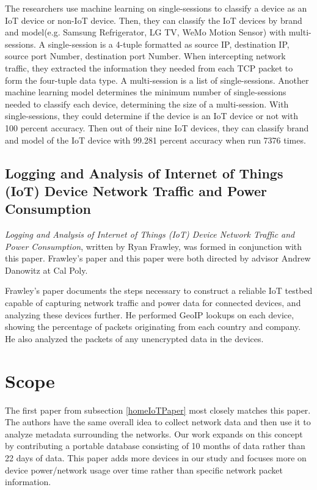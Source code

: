 The researchers use machine learning on single-sessions to classify a device as an IoT device or non-IoT device. Then, they can classify the IoT devices by brand and model(e.g. Samsung Refrigerator, LG TV, WeMo Motion Sensor) with multi-sessions. A single-session is a 4-tuple formatted as source IP, destination IP, source port Number, destination port Number. When intercepting network traffic, they extracted the information they needed from each TCP packet to form the four-tuple data type. A multi-session is a list of single-sessions. Another machine learning model determines the minimum number of single-sessions needed to classify each device, determining the size of a multi-session. With single-sessions, they could determine if the device is an IoT device or not with 100 percent accuracy. Then out of their nine IoT devices, they can classify brand and model of the IoT device with 99.281 percent accuracy when run 7376 times.

\subsection{Logging and Analysis of Internet of Things (IoT) Device Network Traffic and Power Consumption}
\label{frawleyPaper}
\textit{Logging and Analysis of Internet of Things (IoT) Device Network Traffic and Power Consumption}\cite{frawley_2018}, written by Ryan Frawley, was formed in conjunction with this paper. Frawley's paper and this paper were both directed by advisor Andrew Danowitz at Cal Poly.

Frawley's paper documents the steps necessary to construct a reliable IoT testbed capable of capturing network traffic and power data for connected devices, and analyzing these devices further. He performed GeoIP\cite{maxmind} lookups on each device, showing the percentage of packets originating from each country and company. He also analyzed the packets of any unencrypted data in the devices.

\section{Scope}
\label{Scope}
The first paper from subsection \ref{homeIoTPaper} most closely matches this paper. The authors have the same overall idea to collect network data and then use it to analyze metadata surrounding the networks. Our work expands on this concept by contributing a portable database consisting of 10 months of data rather than 22 days of data. This paper adds more devices in our study and focuses more on device power/network usage over time rather than specific network packet information.

